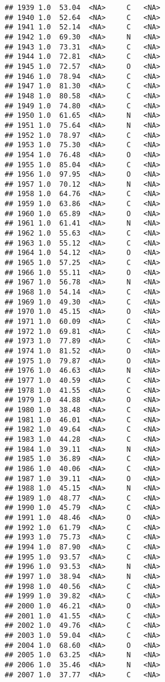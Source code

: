 \documentclass[
]{article}
\begin{document}
\begin{verbatim}
## 1939 1.0  53.04  <NA>     C   <NA>
## 1940 1.0  52.64  <NA>     C   <NA>
## 1941 1.0  52.14  <NA>     C   <NA>
## 1942 1.0  69.30  <NA>     N   <NA>
## 1943 1.0  73.31  <NA>     C   <NA>
## 1944 1.0  72.81  <NA>     C   <NA>
## 1945 1.0  72.57  <NA>     O   <NA>
## 1946 1.0  78.94  <NA>     C   <NA>
## 1947 1.0  81.30  <NA>     C   <NA>
## 1948 1.0  80.58  <NA>     C   <NA>
## 1949 1.0  74.80  <NA>     C   <NA>
## 1950 1.0  61.65  <NA>     N   <NA>
## 1951 1.0  75.64  <NA>     N   <NA>
## 1952 1.0  78.97  <NA>     C   <NA>
## 1953 1.0  75.30  <NA>     C   <NA>
## 1954 1.0  76.48  <NA>     O   <NA>
## 1955 1.0  85.04  <NA>     C   <NA>
## 1956 1.0  97.95  <NA>     O   <NA>
## 1957 1.0  70.12  <NA>     N   <NA>
## 1958 1.0  64.76  <NA>     C   <NA>
## 1959 1.0  63.86  <NA>     C   <NA>
## 1960 1.0  65.89  <NA>     O   <NA>
## 1961 1.0  61.41  <NA>     N   <NA>
## 1962 1.0  55.63  <NA>     C   <NA>
## 1963 1.0  55.12  <NA>     C   <NA>
## 1964 1.0  54.12  <NA>     O   <NA>
## 1965 1.0  57.25  <NA>     C   <NA>
## 1966 1.0  55.11  <NA>     O   <NA>
## 1967 1.0  56.78  <NA>     N   <NA>
## 1968 1.0  54.14  <NA>     C   <NA>
## 1969 1.0  49.30  <NA>     C   <NA>
## 1970 1.0  45.15  <NA>     O   <NA>
## 1971 1.0  60.09  <NA>     C   <NA>
## 1972 1.0  69.81  <NA>     C   <NA>
## 1973 1.0  77.89  <NA>     C   <NA>
## 1974 1.0  81.52  <NA>     O   <NA>
## 1975 1.0  79.87  <NA>     O   <NA>
## 1976 1.0  46.63  <NA>     N   <NA>
## 1977 1.0  40.59  <NA>     C   <NA>
## 1978 1.0  41.55  <NA>     C   <NA>
## 1979 1.0  44.88  <NA>     O   <NA>
## 1980 1.0  38.48  <NA>     C   <NA>
## 1981 1.0  46.01  <NA>     C   <NA>
## 1982 1.0  49.64  <NA>     C   <NA>
## 1983 1.0  44.28  <NA>     C   <NA>
## 1984 1.0  39.11  <NA>     N   <NA>
## 1985 1.0  36.89  <NA>     C   <NA>
## 1986 1.0  40.06  <NA>     C   <NA>
## 1987 1.0  39.11  <NA>     O   <NA>
## 1988 1.0  45.15  <NA>     N   <NA>
## 1989 1.0  48.77  <NA>     C   <NA>
## 1990 1.0  45.79  <NA>     C   <NA>
## 1991 1.0  48.46  <NA>     O   <NA>
## 1992 1.0  61.79  <NA>     C   <NA>
## 1993 1.0  75.73  <NA>     C   <NA>
## 1994 1.0  87.90  <NA>     C   <NA>
## 1995 1.0  93.57  <NA>     C   <NA>
## 1996 1.0  93.53  <NA>     N   <NA>
## 1997 1.0  38.94  <NA>     N   <NA>
## 1998 1.0  40.56  <NA>     C   <NA>
## 1999 1.0  39.82  <NA>     C   <NA>
## 2000 1.0  46.21  <NA>     O   <NA>
## 2001 1.0  41.55  <NA>     C   <NA>
## 2002 1.0  49.76  <NA>     C   <NA>
## 2003 1.0  59.04  <NA>     C   <NA>
## 2004 1.0  68.60  <NA>     O   <NA>
## 2005 1.0  63.25  <NA>     N   <NA>
## 2006 1.0  35.46  <NA>     N   <NA>
## 2007 1.0  37.77  <NA>     C   <NA>

\end{verbatim}
\end{document}
